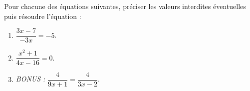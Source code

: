 \documentclass[a4paper,11pt,exos]{nsi} %
\begin{document}
\maketitle




\begin{exercice}
    Pour chacune des équations suivantes, préciser les valeurs interdites éventuelles puis résoudre l'équation :
    \begin{multicols}{3}
        \begin{enumerate}
            \item $\dfrac{3x-7}{-3x}=-5$.
	        \item $\dfrac{x^2+1}{4x-16}=0$.
	        \item  \textit{BONUS :} $\dfrac{4}{9x+1}=\dfrac{4}{3x-2}$.
        \end{enumerate}
    \end{multicols}
    
\end{exercice}
\end{document}
